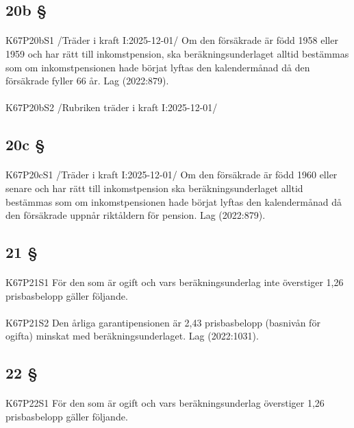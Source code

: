 \documentclass[a4paper,notitlepage,openany,10pt]{book}
\begin{document}
\subsection*{20b §}
\paragraph*{}
{\tiny K67P20bS1}
/Träder i kraft I:2025-12-01/
Om den försäkrade är född 1958 eller 1959 och har rätt till inkomstpension, ska beräkningsunderlaget alltid bestämmas som om inkomstpensionen hade börjat lyftas den kalendermånad då den försäkrade fyller 66 år.
Lag (2022:879).
\paragraph*{}
{\tiny K67P20bS2}
/Rubriken träder i kraft I:2025-12-01/
\subsection*{20c §}
\paragraph*{}
{\tiny K67P20cS1}
/Träder i kraft I:2025-12-01/
Om den försäkrade är född 1960 eller senare och har rätt till inkomstpension ska beräkningsunderlaget alltid bestämmas som om inkomstpensionen hade börjat lyftas den kalendermånad då den försäkrade uppnår riktåldern för pension.
Lag (2022:879).
\subsection*{21 §}
\paragraph*{}
{\tiny K67P21S1}
För den som är ogift och vars beräkningsunderlag inte överstiger 1,26 prisbasbelopp gäller följande.
\paragraph*{}
{\tiny K67P21S2}
Den årliga garantipensionen är 2,43 prisbasbelopp (basnivån för ogifta) minskat med beräkningsunderlaget.
Lag (2022:1031).
\subsection*{22 §}
\paragraph*{}
{\tiny K67P22S1}
För den som är ogift och vars beräkningsunderlag överstiger 1,26 prisbasbelopp gäller följande.
\end{document}
